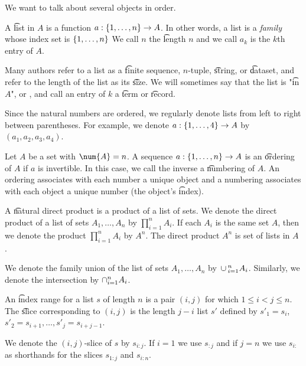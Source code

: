 
We want to talk about several objects in order.


A \t{list} in $A$ is a function $a: \{1, \dots , n\} \to A$.
In other words, a list is a \textit{family} whose index set is $\{1, \dots , n\}$
We call $n$ the \t{length} $n$ and we call $a_k$ is the \t{$k$th entry} of $A$.

Many authors refer to a list as a \t{finite sequence}, \t{$n$-tuple}, \t{string}, or \t{dataset}, and refer to the length of the list as its \t{size}.
We will sometimes say that the list is "\t{in} $A$", or , and call an entry of $k$ a \t{term} or \t{record}.


Since the natural numbers are ordered, we regularly denote lists from left to right between parentheses.
For example, we denote $a: \{1, \dots , 4\} \to A$ by $(a_1, a_2, a_3, a_4)$.

Let $A$ be a set with $\num{A} = n$.
A sequence $a: \{1, \dots , n\} \to A$ is an \t{ordering} of $A$ if $a$ is invertible.
In this case, we call the inverse a \t{numbering} of $A$.
An ordering associates with each number a unique object and a numbering associates with each object a unique number (the object's \t{index}).


A \t{natural direct product} is a product of a list of sets.
We denote the direct product of a list of sets $A_1, \dots , A_n$ by $\prod_{i = 1}^{n} A_i$.
If each $A_i$ is the same set $A$, then we denote the product $\prod_{i = 1}^{n} A_i$ by $A^n$.
The direct product $A^n$ is set of lists in $A$ .

We denote the family union of the list of sets $A_1, \dots , A_n$ by $\,\cup\,_{i = 1}^{n} A_i$.
Similarly, we denote the intersection by $\cap_{i = 1}^{n} A_i$.

An \t{index range} for a list $s$ of length $n$ is a pair $(i, j)$ for which $1 \leq i < j \leq n$.
The \t{slice} corresponding to $(i,j)$ is the length $j-i$ list $s'$ defined by $s'_1 = s_{i}$, $s'_2 = s_{i+1}, \dots, s'_{j} = s_{i + j-1}$.

We denote the $(i,j)$-slice of $s$ by $s_{i:j}$.
If $i = 1$ we use $s_{:j}$ and if $j = n$ we use $s_{i:}$ as shorthands for the slices $s_{1:j}$ and $s_{i:n}$.

